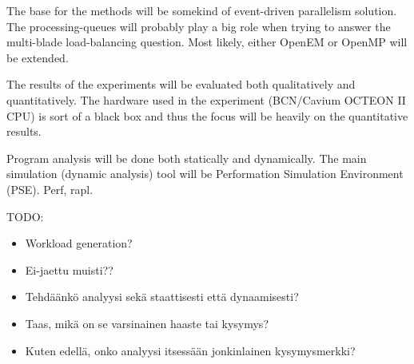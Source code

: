 The base for the methods will be somekind of event-driven parallelism solution. The processing-queues will probably play a big role when trying to answer the multi-blade load-balancing question. Most likely, either OpenEM or OpenMP will be extended.

The results of the experiments will be evaluated both qualitatively and quantitatively. The hardware used in the experiment (BCN/Cavium OCTEON II CPU) is sort of a black box and thus the focus will be heavily on the quantitative results.

Program analysis will be done both statically and dynamically. The main simulation (dynamic analysis) tool will be Performation Simulation Environment (PSE). Perf, rapl.

TODO:
\begin{itemize}
\item Workload generation?
\item Ei-jaettu muisti??
\item Tehdäänkö analyysi sekä staattisesti että dynaamisesti?
\item Taas, mikä on se varsinainen haaste tai kysymys?
\item Kuten edellä, onko analyysi itsessään jonkinlainen kysymysmerkki?
\end{itemize}







